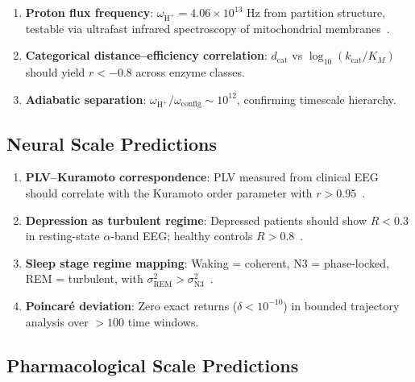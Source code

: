 \documentclass[twocolumn,10pt]{article}
\theoremstyle{remark}
\newcommand{\dcat}{d_{\mathrm{cat}}}
\newcommand{\Hplus}{\mathrm{H}^{+}}
\newcommand{\Rorder}{R}
\begin{document}
\begin{enumerate}[nosep]
  \item \textbf{Proton flux frequency}: $\omega_{\Hplus} = 4.06 \times 10^{13}$ Hz from partition structure, testable via ultrafast infrared spectroscopy of mitochondrial membranes~\citep{mitchell1961coupling,wikstrom2015proton}.
  \item \textbf{Categorical distance--efficiency correlation}: $\dcat$ vs $\log_{10}(k_{\mathrm{cat}}/K_M)$ should yield $r < -0.8$ across enzyme classes.
  \item \textbf{Adiabatic separation}: $\omega_{\Hplus}/\omega_{\mathrm{config}} \sim 10^{12}$, confirming timescale hierarchy.
\end{enumerate}

\subsection{Neural Scale Predictions}

\begin{enumerate}[nosep]
  \item \textbf{PLV--Kuramoto correspondence}: PLV measured from clinical EEG should correlate with the Kuramoto order parameter with $r > 0.95$~\citep{lachaux1999measuring}.
  \item \textbf{Depression as turbulent regime}: Depressed patients should show $\Rorder < 0.3$ in resting-state $\alpha$-band EEG; healthy controls $\Rorder > 0.8$~\citep{fingelkurts2006impaired}.
  \item \textbf{Sleep stage regime mapping}: Waking = coherent, N3 = phase-locked, REM = turbulent, with $\sigma^2_{\mathrm{REM}} > \sigma^2_{\mathrm{N3}}$~\citep{steriade2003neuronal,diekelmann2010memory}.
  \item \textbf{Poincar\'e deviation}: Zero exact returns ($\delta < 10^{-10}$) in bounded trajectory analysis over $> 100$ time windows.
\end{enumerate}

\subsection{Pharmacological Scale Predictions}
\end{document}
